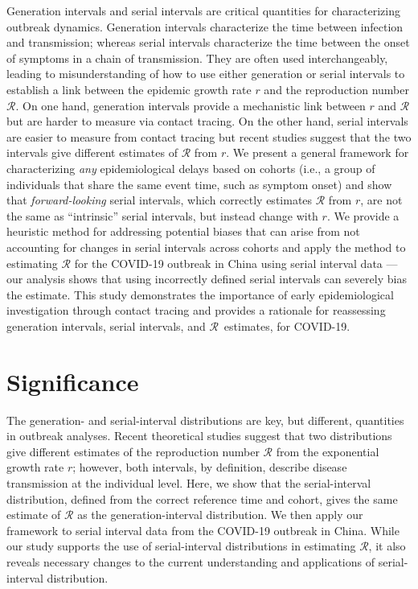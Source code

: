 \documentclass[12pt]{article}
\newcommand{\RR}{\ensuremath{{\mathcal R}}\xspace}
\begin{document}
Generation intervals and serial intervals are critical quantities for characterizing outbreak dynamics.
Generation intervals characterize the time between infection and transmission; whereas serial intervals characterize the time between the onset of symptoms in a chain of transmission.
They are often used interchangeably, leading to misunderstanding of how to use either generation or serial intervals to establish a link between the epidemic growth rate $r$ and the reproduction number \RR.
On one hand, generation intervals provide a mechanistic link between $r$ and \RR but are harder to measure via contact tracing.
On the other hand, serial intervals are easier to measure from contact tracing but recent studies suggest that the two intervals give different estimates of \RR from $r$.
We present a general framework for characterizing \emph{any} epidemiological delays based on cohorts (i.e., a group of individuals that share the same event time, such as symptom onset) and show that \emph{forward-looking} serial intervals, which correctly estimates \RR from $r$, are not the same as ``intrinsic'' serial intervals, but instead change with $r$.
We provide a heuristic method for addressing potential biases that can arise from not accounting for changes in serial intervals across cohorts and apply the method to estimating \RR for the COVID-19 outbreak in China using serial interval data --- our analysis shows that using incorrectly defined serial intervals can severely bias the estimate.
This study demonstrates the importance of early epidemiological investigation through contact tracing and provides a rationale for reassessing generation intervals, serial intervals, and \RR\ estimates, for COVID-19.

\section*{Significance}

The generation- and serial-interval distributions are key, but different, quantities in outbreak analyses.
Recent theoretical studies suggest that two distributions give different estimates of the reproduction number \RR from the exponential growth rate $r$;
however, both intervals, by definition, describe disease transmission at the individual level.
Here, we show that the serial-interval distribution, defined from the correct reference time and cohort, gives the same estimate of \RR as the generation-interval distribution.
We then apply our framework to serial interval data from the COVID-19 outbreak in China.
While our study supports the use of serial-interval distributions in estimating \RR, it also reveals necessary changes to the current understanding and applications of serial-interval distribution.
\end{document}
